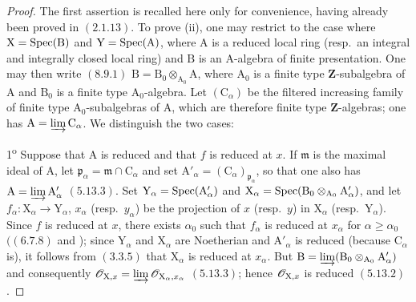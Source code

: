 \begin{proof}
The first assertion is recalled here only for convenience, having already been proved in $(2.1.13)$. To prove (ii), one may restrict to the case where $\mathrm{X}=\operatorname{Spec}(\mathrm{B})$ and $\mathrm{Y}=\operatorname{Spec}(\mathrm{A})$, where $\mathrm{A}$ is a reduced local ring (resp.\ an integral and integrally closed local ring) and $\mathrm{B}$ is an $\mathrm{A}$-algebra of finite presentation. One may then write $(8.9.1)$ $\mathrm{B}=\mathrm{B}_0\otimes_{\mathrm{A}_0}\mathrm{A}$,
where $\mathrm{A}_0$ is a finite type $\mathbf{Z}$-subalgebra of $\mathrm{A}$ and $\mathrm{B}_0$ is a finite type $\mathrm{A}_0$-algebra. Let $(\mathrm{C}_\alpha)$ be the filtered increasing family of finite type $\mathrm{A}_0$-subalgebras of $\mathrm{A}$, which are therefore finite type $\mathbf{Z}$-algebras; one has $\mathrm{A}=\varinjlim\mathrm{C}_\alpha$. We distinguish the two cases:

1\textsuperscript{o} Suppose that $\mathrm{A}$ is reduced and that $f$ is reduced at $x$. If $\mathfrak{m}$ is the maximal ideal of $\mathrm{A}$, let $\mathfrak{p}_\alpha=\mathfrak{m}\cap\mathrm{C}_\alpha$ and set $\mathrm{A}'_\alpha=(\mathrm{C}_\alpha)_{\mathfrak{p}_\alpha}$, so that one also has $\mathrm{A}=\varinjlim\mathrm{A}'_\alpha$ $(5.13.3)$. Set $\mathrm{Y}_\alpha=\operatorname{Spec}(\mathrm{A}'_\alpha)$ and $\mathrm{X}_\alpha=\operatorname{Spec}(\mathrm{B}_0\otimes_{\mathrm{A}_0}\mathrm{A}'_\alpha)$, and let $f_\alpha:\mathrm{X}_\alpha\to\mathrm{Y}_\alpha$, $x_\alpha$ (resp.\ $y_\alpha$) be the projection of $x$ (resp.\ $y$) in $\mathrm{X}_\alpha$ (resp.\ $\mathrm{Y}_\alpha$). Since $f$ is reduced at $x$, there exists $\alpha_0$ such that $f_\alpha$ is reduced at $x_\alpha$ for $\alpha\geqslant\alpha_0$ $((6.7.8)$ and ); since $\mathrm{Y}_\alpha$ and $\mathrm{X}_\alpha$ are Noetherian and $\mathrm{A}'_\alpha$ is reduced (because $\mathrm{C}_\alpha$ is), it follows from $(3.3.5)$ that $\mathrm{X}_\alpha$ is reduced at $x_\alpha$. But $\mathrm{B}=\varinjlim(\mathrm{B}_0\otimes_{\mathrm{A}_0}\mathrm{A}'_\alpha)$
and consequently $\mathscr{O}_{\mathrm{X},x}=\varinjlim\mathscr{O}_{\mathrm{X}_\alpha,x_\alpha}$ $(5.13.3)$; hence $\mathscr{O}_{\mathrm{X},x}$ is reduced $(5.13.2)$.


\end{proof}
